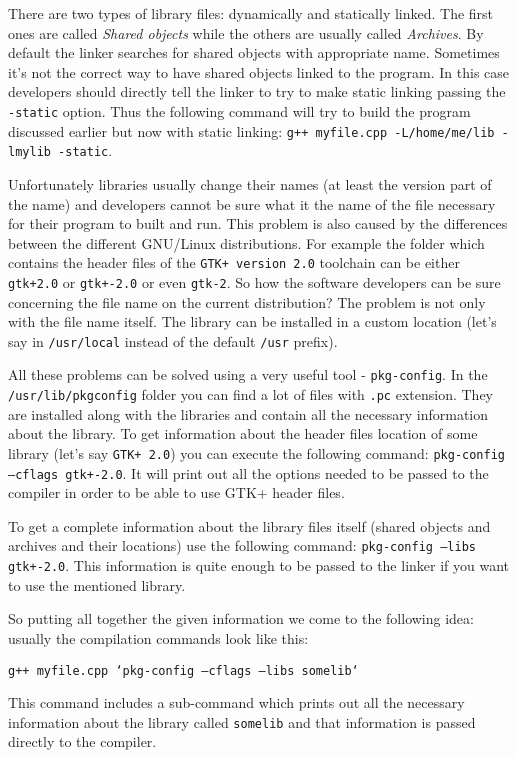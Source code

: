 There are two types of library files: dynamically and statically linked. The first ones are called \textit {Shared objects} while the others are usually called  \textit {Archives}. By default the linker searches for shared objects with appropriate name. Sometimes it's not the correct way to have shared objects linked to the program. In this case developers should directly tell the linker to try to make static linking passing the {\tt -static} option. Thus the following command will try to build the program discussed earlier but now with static linking: {\tt g++ myfile.cpp -L/home/me/lib -lmylib -static}. 

Unfortunately libraries usually change their names (at least the version part of the name) and developers cannot be sure what it the name of the file necessary for their program to built and run. This problem is also caused by the differences between the different GNU/Linux distributions. For example the folder which contains the header files of the {\tt GTK+ version 2.0} toolchain can be either {\tt gtk+2.0} or {\tt gtk+-2.0} or even {\tt gtk-2}. So how the software developers can be sure concerning the file name on the current distribution? The problem is not only with the file name itself. The library can be installed in a custom location (let's say in {\tt /usr/local} instead of the default {\tt /usr} prefix).

All these problems can be solved using a very useful tool - {\tt pkg-config}. In the {\tt /usr/lib/pkgconfig} folder you can find a lot of files with {\tt .pc} extension. They are installed along with the libraries and contain all the necessary information about the library. To get information about the header files location of some library (let's say {\tt GTK+ 2.0}) you can execute the following command: {\tt pkg-config --cflags gtk+-2.0}. It will print out all the options needed to be passed to the compiler in order to be able to use GTK+ header files.

To get a complete information about the library files itself (shared objects and archives and their locations) use the following command: {\tt pkg-config --libs gtk+-2.0}. This information is quite enough to be passed to the linker if you want to use the mentioned library.

So putting all together the given information we come to the following idea: usually the compilation commands look like this:

{\tt g++ myfile.cpp  `pkg-config --cflags --libs somelib` }

This command includes a sub-command which prints out all the necessary information about the library called {\tt somelib} and that information is passed directly to the compiler.
